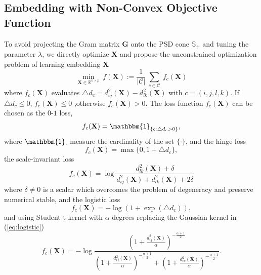 \documentclass[letterpaper]{article}
\begin{document}
		\subsection{Embedding with Non-Convex Objective Function}
		To avoid projecting the Gram matrix $\mathbf{G}$ onto the PSD cone $\mathbb{S}_{+}$ and tuning the parameter $\lambda$, we directly optimize $\mathbf{X}$ and propose the unconstrained optimization problem of learning embedding $\mathbf{X}$
		\begin{equation}
			\label{eq:2}
			\underset{\mathbf{X}\in\mathbb{R}^{n \times p}}{\min}\ f(\mathbf{X}):=\frac{1}{|\mathcal{C}|}\ \underset{c\in\mathcal{C}}{\sum}\ f_c(\mathbf{X})
		\end{equation}
		where $f_c(\mathbf{X})$ evaluates $\triangle d_c = d^2_{ij}(\mathbf{X})-d^2_{lk}(\mathbf{X})$ with $c=(i,j,l,k)$. If $\triangle d_c\leq 0$, $f_c(\mathbf{X})\leq 0$ ,otherwise $f_c(\mathbf{X})>0$. The loss function $f_c(\mathbf{X})$ can be chosen as the $0$-$1$ loss,
		\begin{equation}
			\label{eq:0-1}
			f_c(\mathbf{X}) = \mathbbm{1}_{\{c:\triangle d_c > 0\}},
		\end{equation}
		where $\mathbbm{1}_{\cdot}$ measure the cardinality of the set $\{\cdot\}$, and the hinge loss \cite{agarwal2007generalized}
		\begin{equation}
			\label{eq:hinge}
			f_c(\mathbf{X}) = \max\{0, 1+\triangle d_c\},
		\end{equation}
		the scale-invariant loss \cite{tamuz2011adaptiive}
		\begin{equation}
			\label{eq:scale-invariant}
			f_c(\mathbf{X}) = \log\frac{d^2_{lk}(\mathbf{X})+\delta}{d^2_{ij}(\mathbf{X})+d^2_{lk}(\mathbf{X})+2\delta}
		\end{equation}
		where $\delta\neq 0$ is a scalar which overcomes the problem of degeneracy and preserve numerical stable, and the logistic loss \cite{vandermaaten2012stochastic}
		\begin{equation}
			\label{eq:logistic}
			f_c(\mathbf{X}) = -\log(1+\exp(\triangle d_c)),
		\end{equation}
		and using Student-t kernel with $\alpha$ degrees replacing the Gaussian kernel in (\ref{eq:logistic}) \cite{vandermaaten2012stochastic}
		\begin{equation}
			\label{eq:student}
			f_c(\mathbf{X}) = -\log\frac{\left(1+\frac{d^2_{ij}(\mathbf{X})}{\alpha}\right)^{-\frac{\alpha+1}{2}}}{\left(1+\frac{d^2_{ij}(\mathbf{X})}{\alpha}\right)^{-\frac{\alpha+1}{2}}+\left(1+\frac{d^2_{lk}(\mathbf{X})}{\alpha}\right)^{-\frac{\alpha+1}{2}}}.
		\end{equation}
\end{document}
